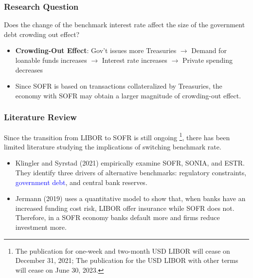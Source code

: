\documentclass[10pt]{beamer}
\begin{document}
\begin{frame}
\frametitle{Research Question}
Does the change of the benchmark interest rate affect the size of the government debt crowding out effect?
\begin{itemize}
\item \textbf{Crowding-Out Effect}: Gov't issues more Treasuries $\rightarrow$ Demand for loanable funds increases $\rightarrow$ Interest rate increases $\rightarrow$ Private spending decreases
\item Since SOFR is based on transactions collateralized by Treasuries,  the economy with SOFR may obtain a larger magnitude of crowding-out effect.
\end{itemize}
\end{frame}

\begin{frame}
\frametitle{Literature Review}
Since the transition from LIBOR to SOFR is still ongoing \footnote{The publication for one-week and two-month USD LIBOR will cease on December 31, 2021; The publication for the USD LIBOR with other terms will cease on June 30, 2023.},  there has been limited literature studying the implications of switching benchmark rate.
\begin{itemize}
\item Klingler and Syrstad (2021) empirically examine SOFR,  SONIA,  and ESTR.  They identify three drivers of alternative benchmarks: regulatory constraints,  \textcolor{blue}{government debt},  and central bank reserves.
\item Jermann (2019) uses a quantitative model to show that,  when banks have an increased funding cost risk,  LIBOR offer insurance while SOFR does not.  Therefore,  in a SOFR economy banks default more and firms reduce investment more.
\end{itemize}
\end{frame}
\end{document}
